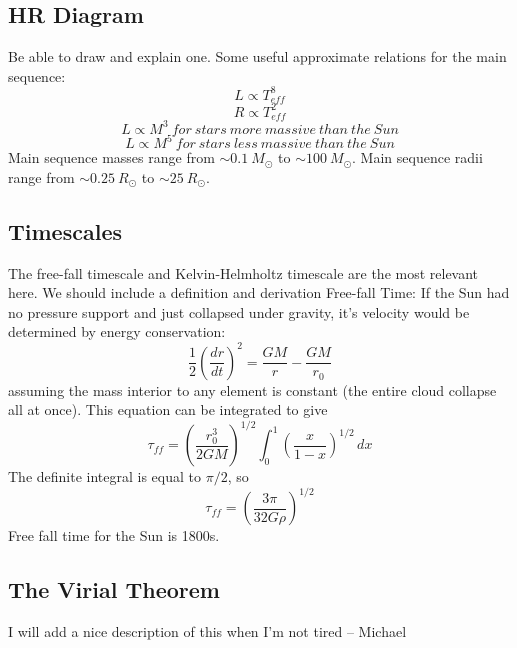 \subsection{HR Diagram}
Be able to draw and explain one.  Some useful approximate relations for the main sequence:
\begin{equation}L\propto T_{eff}^8\end{equation}
\begin{equation}R\propto T_{eff}^2\end{equation}
\begin{equation}L\propto M^3\ for\ stars\ more\ massive\ than\ the\ Sun\end{equation}
\begin{equation}L\propto M^5\ for\ stars\ less\ massive\ than\ the\ Sun\end{equation}
Main sequence masses range from $\sim 0.1\ M_{\odot}$ to $\sim 100\ M_{\odot}$.  Main sequence 
radii range from $\sim 0.25\ R_{\odot}$ to $\sim 25\ R_{\odot}$.

\subsection{Timescales}
The free-fall timescale and Kelvin-Helmholtz timescale are the most relevant here.  We should
include a definition and derivation
Free-fall Time:\newline
If the Sun had no pressure support and just collapsed under gravity, it's velocity would be 
determined by energy conservation:
\begin{equation}
\frac{1}{2}\left(\frac{dr}{dt}\right)^2 = \frac{GM}{r}-\frac{GM}{r_0}
\end{equation}
assuming the mass interior to any element is constant (the entire cloud collapse all at once).
This equation can be integrated to give
\begin{equation}
\tau_{ff}=\left(\frac{r_0^3}{2GM}\right)^{1/2}\int_0^1\left(\frac{x}{1-x}\right)^{1/2}\,dx
\end{equation}
The definite integral is equal to $\pi/2$, so
\begin{equation}
\tau_{ff}=\left(\frac{3\pi}{32G\rho}\right)^{1/2}
\end{equation}
Free fall time for the Sun is 1800s.

\subsection{The Virial Theorem}
I will add a nice description of this when I'm not tired -- Michael

